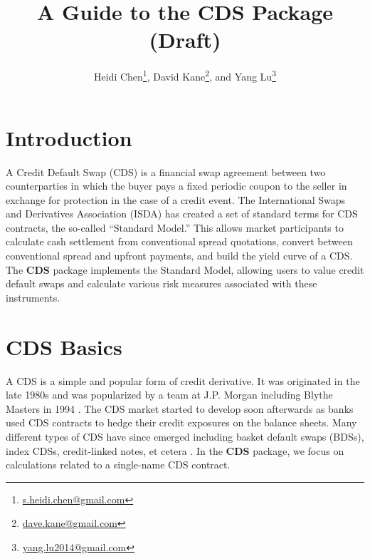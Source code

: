 \documentclass[a4paper]{article}
\begin{document}
\title{A Guide to the CDS Package (Draft)}
\author{Heidi Chen\thanks{\href{mailto:s.heidi.chen@gmail.com}{s.heidi.chen@gmail.com}}, David Kane\thanks{\href{mailto:dave.kane@gmail.com}{dave.kane@gmail.com}}, and Yang Lu\thanks{\href{mailto:yang.lu2014@gmail.com}{yang.lu2014@gmail.com}}}
\maketitle




\section{Introduction}


A Credit Default Swap (CDS) is a financial swap agreement between two
counterparties in which the buyer pays a fixed periodic coupon to the
seller in exchange for protection in the case of a credit event. The
International Swaps and Derivatives Association (ISDA) has created a
set of standard terms for CDS contracts, the so-called ``Standard
Model.'' This allows market participants to calculate cash settlement
from conventional spread quotations, convert between conventional
spread and upfront payments, and build the yield curve of a CDS. The
\textbf{CDS} package implements the Standard Model, allowing users to
value credit default swaps and calculate various risk measures
associated with these instruments.

\section{CDS Basics}



A CDS is a simple and popular form of credit derivative. It was
originated in the late 1980s and was popularized by a team at
J.P. Morgan including Blythe Masters in 1994 \citep{cdsOrigins,
  blythe}. The CDS market started to develop soon afterwards as banks
used CDS contracts to hedge their credit exposures on the balance
sheets. Many different types of CDS have since emerged including
basket default swaps (BDSs), index CDSs, credit-linked notes, et
cetera \citep{jk}. In the \textbf{CDS} package, we focus on calculations
related to a single-name CDS contract.
\end{document}
